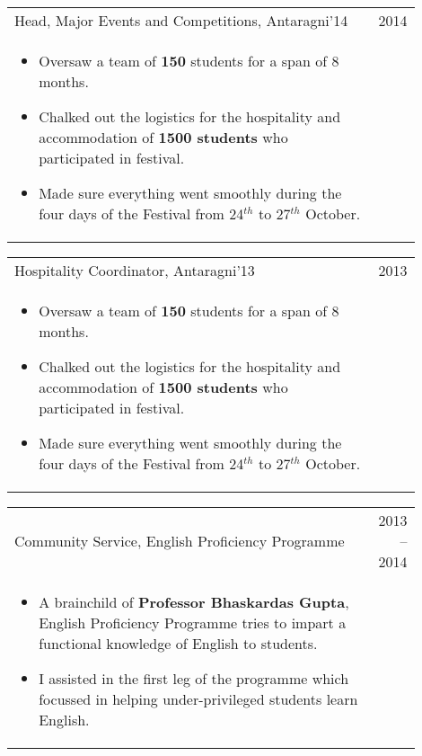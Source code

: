 \documentclass[a4paper,10pt]{article} %
\newcommand{\projectlistdated}[3]{
    \begin{tabular}{p{0.9\linewidth}r}
        \textcolor{NavyBlue}{#2} & \textsc{#1}\\
        \vspace{-0.3cm}
        \footnotesize{#3}
    \end{tabular}
    \vspace{-0.4cm}
}
\begin{document}
\projectlistdated {2014}
                  {Head, Major Events and Competitions, Antaragni'14}
                  {
                       \begin{itemize}
                           \item Oversaw a team of \textbf{150} students for a span of 8 months.
                           \item Chalked out the logistics for the hospitality and accommodation of \textbf{1500 students} who
                               participated in festival.
                           \item Made sure everything went smoothly during the four days of the Festival from 24$^{th}$
                               to 27$^{th}$ October.
                       \end{itemize}
                  }

\projectlistdated {2013}
                  {Hospitality Coordinator, Antaragni'13}
                  {
                       \begin{itemize}
                           \item Oversaw a team of \textbf{150} students for a span of 8 months.
                           \item Chalked out the logistics for the hospitality and accommodation of \textbf{1500 students} who
                               participated in festival.
                           \item Made sure everything went smoothly during the four days of the Festival from 24$^{th}$
                               to 27$^{th}$ October.
                       \end{itemize}
                  }

\projectlistdated {2013 -- 2014}
                  {Community Service, English Proficiency Programme}
                  {
                       \begin{itemize}
                           \item A brainchild of \textbf{Professor Bhaskardas Gupta}, English Proficiency
                               Programme tries to impart a functional knowledge of English to students.
                           \item I assisted in the first leg of the programme which focussed in helping
                               under-privileged students learn English.
                       \end{itemize}
                  }
\end{document}
